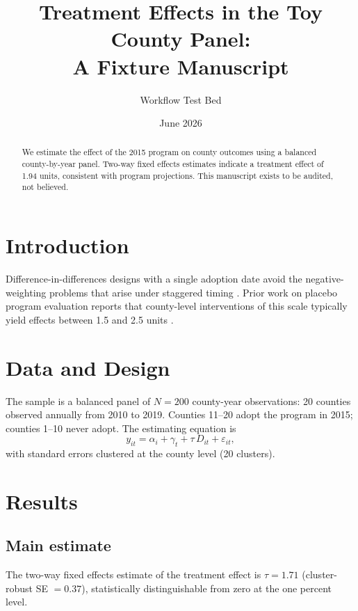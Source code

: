 \documentclass[12pt]{article}
\title{Treatment Effects in the Toy County Panel:\\ A Fixture Manuscript}
\author{Workflow Test Bed}
\date{June 2026}
\begin{document}
\maketitle

\begin{abstract}
We estimate the effect of the 2015 program on county outcomes using a
balanced county-by-year panel. Two-way fixed effects estimates indicate a
treatment effect of 1.94 units, consistent with program projections.
This manuscript exists to be audited, not believed.
\end{abstract}

\section{Introduction}

Difference-in-differences designs with a single adoption date avoid the
negative-weighting problems that arise under staggered timing
\citep{goodmanbacon2021}. Prior work on placebo program evaluation reports
that county-level interventions of this scale typically yield effects
between 1.5 and 2.5 units \citep{smith2019placebo}.

\section{Data and Design}

The sample is a balanced panel of $N = 200$ county-year observations:
20 counties observed annually from 2010 to 2019. Counties 11--20 adopt the
program in 2015; counties 1--10 never adopt. The estimating equation is
\begin{equation}
  y_{it} = \alpha_i + \gamma_t + \tau \, D_{it} + \varepsilon_{it},
\end{equation}
with standard errors clustered at the county level (20 clusters).

\section{Results}

\subsection{Main estimate}

The two-way fixed effects estimate of the treatment effect is
$\hat{\tau} = 1.71$ (cluster-robust SE $= 0.37$), statistically
distinguishable from zero at the one percent level.
\end{document}
